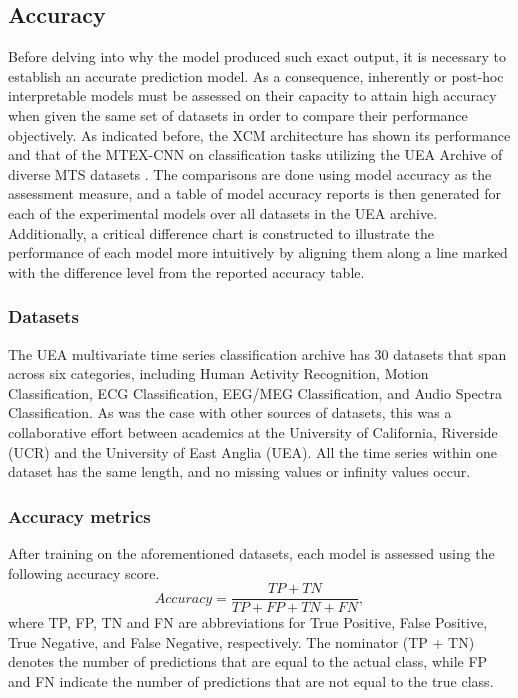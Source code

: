 \documentclass{svproc}
\begin{document}
\subsection{Accuracy}
Before delving into why the model produced such exact output, it is necessary to establish an accurate prediction model. As a consequence, inherently or post-hoc interpretable models must be assessed on their capacity to attain high accuracy when given the same set of datasets in order to compare their performance objectively. As indicated before, the XCM architecture has shown its performance and that of the MTEX-CNN on classification tasks utilizing the UEA Archive of diverse MTS datasets \cite{bagnall2018uea}. The comparisons are done using model accuracy as the assessment measure, and a table of model accuracy reports is then generated for each of the experimental models over all datasets in the UEA archive. Additionally, a critical difference chart is constructed to illustrate the performance of each model more intuitively by aligning them along a line marked with the difference level from the reported accuracy table.

\subsubsection{Datasets}

The UEA multivariate time series classification archive \cite{bagnall2018uea} has 30 datasets that span across six categories, including Human Activity Recognition, Motion Classification, ECG Classification, EEG/MEG Classification, and Audio Spectra Classification. As was the case with other sources of datasets, this was a collaborative effort between academics at the University of California, Riverside (UCR) and the University of East Anglia (UEA). All the time series within one dataset has the same length, and no missing values or infinity values occur. 

\subsubsection{Accuracy metrics}

After training on the aforementioned datasets, each model is assessed using the following accuracy score. 
\begin{equation}
Accuracy = \frac{TP + TN}{TP + FP + TN + FN},
\end{equation}
where TP, FP, TN and FN are abbreviations for True Positive, False Positive, True Negative, and False Negative, respectively. The nominator (TP + TN) denotes the number of predictions that are equal to the actual class, while FP and FN indicate the number of predictions that are not equal to the true class. 
\end{document}
